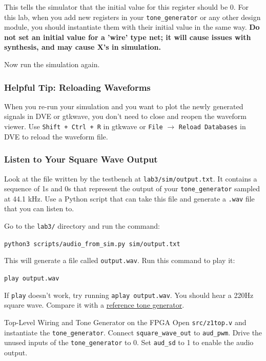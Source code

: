 \documentclass[11pt]{article}
\makeatletter
\renewcommand{\section}
{\@startsection {section}{1}{0pt}
 {-2ex}
 {1ex}
 {\bfseries\Large}}
\makeatother
\begin{document}
This tells the simulator that the initial value for this register should be 0.
For this lab, when you add new registers in your \verb|tone_generator| or any other design module, you should instantiate them with their initial value in the same way.
\textbf{Do not set an initial value for a 'wire' type net; it will cause issues with synthesis, and may cause X's in simulation.}

Now run the simulation again.
\subsubsection{Helpful Tip: Reloading Waveforms}
When you re-run your simulation and you want to plot the newly generated signals in DVE or gtkwave, you don't need to close and reopen the waveform viewer.
Use \verb|Shift + Ctrl + R| in gtkwave or \verb|File| $\rightarrow$ \verb|Reload Databases| in DVE to reload the waveform file.

\subsubsection{Listen to Your Square Wave Output}
Look at the file written by the testbench at \verb|lab3/sim/output.txt|.
It contains a sequence of 1s and 0s that represent the output of your \verb|tone_generator| sampled at 44.1 kHz.
Use a Python script that can take this file and generate a \verb|.wav| file that you can listen to.

Go to the \verb|lab3/| directory and run the command:

\verb|python3 scripts/audio_from_sim.py sim/output.txt|

This will generate a file called \verb|output.wav|. Run this command to play it:

\verb|play output.wav|

If \verb|play| doesn't work, try running \verb|aplay output.wav|.
You should hear a 220Hz square wave. Compare it with a \href{https://www.szynalski.com/tone-generator/}{reference tone generator}.

\section{Top-Level Wiring and Tone Generator on the FPGA}
Open \verb|src/z1top.v| and instantiate the \verb|tone_generator|.
Connect \verb|square_wave_out| to \verb|aud_pwm|.
Drive the unused inputs of the \verb|tone_generator| to 0.
Set \verb|aud_sd| to 1 to enable the audio output.
\end{document}
